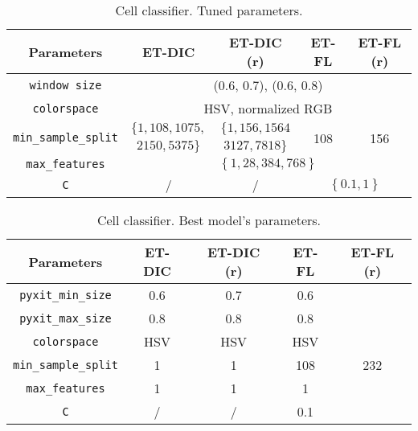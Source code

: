 \begin{table}
	\center 
	\begin{tabular}{|c|cccc|}
		\hline
		Parameters & ET-DIC & ET-DIC (r) & ET-FL & ET-FL (r) \\
		\hline		
		\texttt{window size} & \multicolumn{4}{|c|}{(0.6, 0.7), (0.6, 0.8)} \\
		\texttt{colorspace} & \multicolumn{4}{|c|}{HSV, normalized RGB} \\
		\multirow{2}{*}{\texttt{min\_sample\_split}} & $\{1, 108, 1075,$ &  $\{1, 156, 1564$ & \multirow{2}{*}{108} & \multirow{2}{*}{156}\\
		& $2150, 5375\}$ & $3127, 7818 \}$ & & \\
		\texttt{max\_features} & \multicolumn{4}{|c|}{$\left\{1, 28, 384, 768\right\}$}\\ 
		\texttt{C} & / & / & \multicolumn{2}{c|}{$\left\{0.1, 1\right\}$}\\
		\hline
	\end{tabular}
	\caption{Cell classifier. Tuned parameters.}
	\label{tab:app_cell_classif_tuned}
\end{table}

\begin{table}
	\small
	\center 
	\begin{tabular}{|c|c|c|c|c|}
		\hline
		Parameters & ET-DIC & ET-DIC (r) & ET-FL & ET-FL (r) \\
		\hline		
		\texttt{pyxit\_min\_size} & 0.6 & 0.7 & 0.6 & \\
		\texttt{pyxit\_max\_size} & 0.8 & 0.8 & 0.8 & \\
		\texttt{colorspace} & HSV & HSV & HSV & \\
		\texttt{min\_sample\_split} & 1 & 1 & 108 & 232\\
		\texttt{max\_features} & 1 & 1 & 1 & \\ 
		\texttt{C} & / & / & 0.1 & \\
		\hline
	\end{tabular}
	\caption{Cell classifier. Best model's parameters.}
	\label{tab:cell_classif_best_params}
\end{table}

